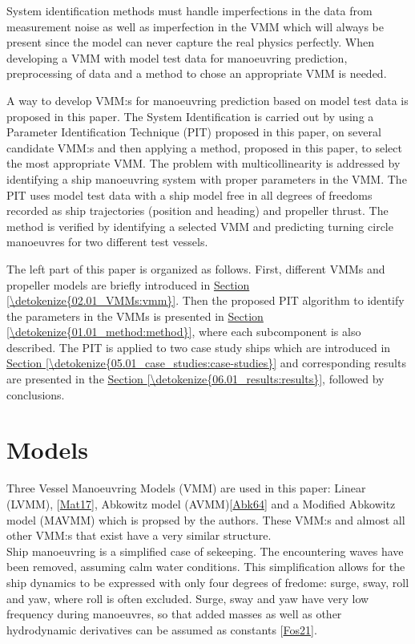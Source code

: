 \documentclass[review]{elsarticle}
\begin{document}
\sphinxAtStartPar
System identification methods must handle imperfections in the data from measurement noise as well as imperfection in the VMM which will always be present since the model can never capture the real physics perfectly. When developing a VMM with model test data for manoeuvring prediction, preprocessing of data and a method to chose an appropriate VMM is needed.

\sphinxAtStartPar
A way to develop VMM:s for manoeuvring prediction based on model test data is proposed in this paper. The System Identification is carried out by using a Parameter Identification Technique (PIT) proposed in this paper, on several candidate VMM:s and then applying a method, proposed in this paper, to select the most appropriate VMM. The problem with multicollinearity is addressed by identifying a ship manoeuvring system with proper parameters in the VMM.
The PIT uses model test data with a ship model free in all degrees of freedoms recorded as ship trajectories (position and heading) and propeller thrust. The method is verified by identifying a selected VMM and predicting turning circle manoeuvres for two different test vessels.

\sphinxAtStartPar
The left part of this paper is organized as follows. First, different VMMs and propeller models are briefly introduced in \hyperref[\detokenize{02.01_VMMs:vmm}]{Section \ref{\detokenize{02.01_VMMs:vmm}}}. Then the proposed PIT algorithm to identify the parameters in the VMMs is presented in \hyperref[\detokenize{01.01_method:method}]{Section \ref{\detokenize{01.01_method:method}}}, where each subcomponent is also described. The PIT is applied to two case study ships which are introduced in \hyperref[\detokenize{05.01_case_studies:case-studies}]{Section \ref{\detokenize{05.01_case_studies:case-studies}}} and corresponding results are presented in the \hyperref[\detokenize{06.01_results:results}]{Section \ref{\detokenize{06.01_results:results}}}, followed by conclusions.


\section{Models}
\label{\detokenize{02.01_VMMs:models}}\label{\detokenize{02.01_VMMs:vmm}}\label{\detokenize{02.01_VMMs::doc}}
\sphinxAtStartPar
Three Vessel Manoeuvring Models (VMM) are used in this paper: Linear (LVMM), {[}\hyperlink{cite.bibligraphy:id40}{Mat17}{]}, Abkowitz model (AVMM){[}\hyperlink{cite.bibligraphy:id25}{Abk64}{]} and a Modified Abkowitz model (MAVMM) which is  propsed by the authors. These VMM:s and almost all other VMM:s that exist have a very similar structure.\\
Ship manoeuvring is a simplified case of sekeeping. The encountering waves have been removed, assuming calm water conditions. This simplification allows for the ship dynamics to be expressed with only four degrees of fredome: surge, sway, roll and yaw, where roll is often excluded. Surge, sway and yaw have very low frequency during manoeuvres, so that added masses as well as other hydrodynamic derivatives can be assumed as constants {[}\hyperlink{cite.bibligraphy:id87}{Fos21}{]}.
\end{document}
